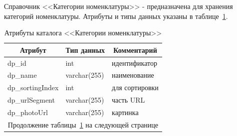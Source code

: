 Справочник <<Категории номенклатуры>> - предназначена для хранения категорий номенклатуры.
Атрибуты и типы данных указаны в таблице~\ref{tab:DP_CTL_ItemCategories}.

\begin{table}[!htb]
    \centering\small

    \caption{Атрибуты каталога <<Категории номенклатуры>>}
    \label{tab:DP_CTL_ItemCategories}

    \begin{tabular}{|p{5cm}|p{2.5cm}|p{9cm}|}
        \hline
        \multicolumn{1}{|c|}{Атрибут}
        & \multicolumn{1}{c|}{Тип данных}
        & \multicolumn{1}{c|}{Комментарий}
        \\ \hline

        dp\_id & int & идентификатор \\ \hline
        dp\_name & varchar(255) & наименование \\ \hline
        dp\_sortingIndex & int & для сортировки \\ \hline
        dp\_urlSegment & varchar(255) & часть URL\\ \hline
        dp\_photoUrl & varchar(255) & картинка\\ \hline
        \multicolumn{3}{c}{\normalsize Продолжение таблицы~\ref{tab:DP_CTL_ItemCategories} на следующей странице} \\
    \end{tabular}
\end{table}

